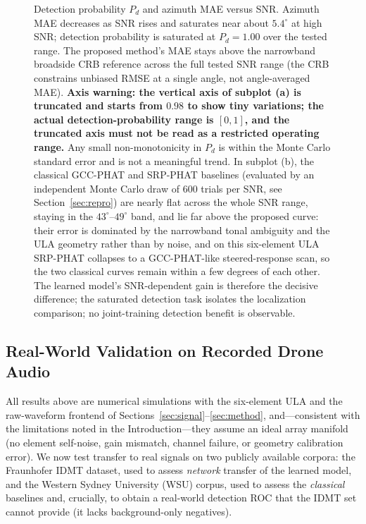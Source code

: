 \documentclass[sensors,article,submit,pdftex,moreauthors]{Definitions/mdpi}
\begin{document}
\begin{figure}[H]
\caption{Detection probability $P_d$ and azimuth MAE versus SNR. Azimuth MAE decreases as SNR rises and saturates near about $5.4^\circ$ at high SNR; detection probability is saturated at $P_d=1.00$ over the tested range. The proposed method's MAE stays above the narrowband broadside CRB reference across the full tested SNR range (the CRB constrains unbiased RMSE at a single angle, not angle-averaged MAE). \textbf{Axis warning: the vertical axis of subplot (a) is truncated and starts from $0.98$ to show tiny variations; the actual detection-probability range is $[0,1]$, and the truncated axis must not be read as a restricted operating range.} Any small non-monotonicity in $P_d$ is within the Monte Carlo standard error and is not a meaningful trend. In subplot (b), the classical GCC-PHAT and SRP-PHAT baselines (evaluated by an independent Monte Carlo draw of 600 trials per SNR, see Section~\ref{sec:repro}) are nearly flat across the whole SNR range, staying in the $43^\circ$--$49^\circ$ band, and lie far above the proposed curve: their error is dominated by the narrowband tonal ambiguity and the ULA geometry rather than by noise, and on this six-element ULA SRP-PHAT collapses to a GCC-PHAT-like steered-response scan, so the two classical curves remain within a few degrees of each other. The learned model's SNR-dependent gain is therefore the decisive difference; the saturated detection task isolates the localization comparison; no joint-training detection benefit is observable.}
\label{fig:snr}
\end{figure}

\subsection{Real-World Validation on Recorded Drone Audio}
\label{sec:real}
All results above are numerical simulations with the six-element ULA and the raw-waveform frontend of Sections~\ref{sec:signal}--\ref{sec:method}, and---consistent with the limitations noted in the Introduction---they assume an ideal array manifold (no element self-noise, gain mismatch, channel failure, or geometry calibration error). We now test transfer to real signals on two publicly available corpora: the Fraunhofer IDMT dataset, used to assess \emph{network} transfer of the learned model, and the Western Sydney University (WSU) corpus, used to assess the \emph{classical} baselines and, crucially, to obtain a real-world detection ROC that the IDMT set cannot provide (it lacks background-only negatives).
\end{document}
